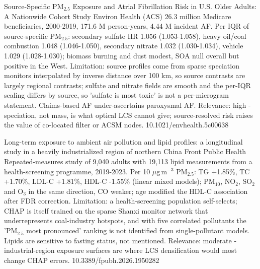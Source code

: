 \documentclass[10pt]{article}
\begin{document}

{Source-Specific PM$_{2.5}$ Exposure and Atrial Fibrillation Risk in U.S. Older Adults: A Nationwide Cohort Study}
{Environ Health (ACS)}
{26.3 million Medicare beneficiaries, 2000-2019, 171.6 M person-years, 4.44 M incident AF. Per IQR of source-specific PM$_{2.5}$: secondary sulfate HR 1.056 (1.053-1.058), heavy oil/coal combustion 1.048 (1.046-1.050), secondary nitrate 1.032 (1.030-1.034), vehicle 1.029 (1.028-1.030); biomass burning and dust modest, SOA null overall but positive in the West. Limitation: source profiles come from sparse speciation monitors interpolated by inverse distance over 100 km, so source contrasts are largely regional contrasts; sulfate and nitrate fields are smooth and the per-IQR scaling differs by source, so 'sulfate is most toxic' is not a per-microgram statement. Claims-based AF under-ascertains paroxysmal AF. Relevance: high - speciation, not mass, is what optical LCS cannot give; source-resolved risk raises the value of co-located filter or ACSM nodes.}
{10.1021/envhealth.5c00638}

{Long-term exposure to ambient air pollution and lipid profiles: a longitudinal study in a heavily industrialized region of northern China}
{Front Public Health}
{Repeated-measures study of 9,040 adults with 19,113 lipid measurements from a health-screening programme, 2019-2023. Per 10 $\mu$g\,m$^{-3}$ PM$_{2.5}$: TG +1.85\%, TC +1.70\%, LDL-C +1.81\%, HDL-C -1.55\% (linear mixed models); PM$_{10}$, NO$_2$, SO$_2$ and O$_3$ in the same direction, CO weaker; age modified the HDL-C association after FDR correction. Limitation: a health-screening population self-selects; CHAP is itself trained on the sparse Shanxi monitor network that underrepresents coal-industry hotspots, and with five correlated pollutants the 'PM$_{2.5}$ most pronounced' ranking is not identified from single-pollutant models. Lipids are sensitive to fasting status, not mentioned. Relevance: moderate - industrial-region exposure surfaces are where LCS densification would most change CHAP errors.}
{10.3389/fpubh.2026.1950282}
\end{document}
